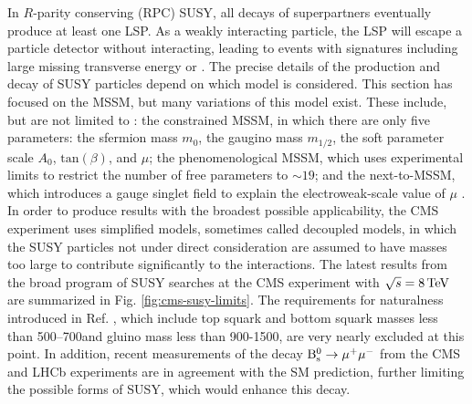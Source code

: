 In $R$-parity conserving (RPC) SUSY, all decays of superpartners eventually produce at least one LSP. As a weakly interacting particle, the LSP will escape a particle detector without interacting, leading to events with signatures including large missing transverse energy or \met. The precise details of the production and decay of SUSY particles depend on which model is considered. This section has focused on the MSSM, but many variations of this model exist. These include, but are not limited to \cite{PDG}: the constrained MSSM, in which there are only five parameters: the sfermion mass $m_0$, the gaugino mass $m_{1/2}$, the soft parameter scale $A_{0}$, $\text{tan}(\beta)$, and $\mu$; the phenomenological MSSM, which uses experimental limits to restrict the number of free parameters to ${\sim}19$; and the next-to-MSSM, which introduces a gauge singlet field to explain the electroweak-scale value of $\mu$ \cite{NMSSM}. In order to produce results with the broadest possible applicability, the CMS experiment uses simplified models, sometimes called decoupled models, in which the SUSY particles not under direct consideration are assumed to have masses too large to contribute significantly to the interactions. The latest results from the broad program of SUSY searches at the CMS experiment with $\sqrt{s}=8\,\text{Te\hspace{-.08em}V}$ are summarized in Fig. \ref{fig:cms-susy-limits}. The requirements for naturalness introduced in Ref. \cite{NaturalSUSY}, which include top squark and bottom squark masses less than 500--700\GeV and gluino mass less than 900-1500\GeV, are very nearly excluded at this point. In addition, recent measurements of the decay $\mathrm{B}^{0}_{\mathrm{s}} \rightarrow \mu^{+} \mu^{-}$ from the CMS \cite{CMS-BSmumu} and LHCb \cite{LHCb-BSmumu} experiments are in agreement with the SM prediction, further limiting the possible forms of SUSY, which would enhance this decay.

